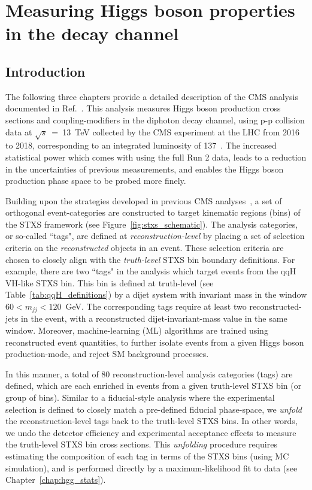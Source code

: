 \chapter{Measuring Higgs boson properties in the \Hgg decay channel}
\label{chap:hgg_overview}

\section{Introduction}\label{sec:hgg_introduction}
The following three chapters provide a detailed description of the CMS \Hgg analysis documented in Ref.~\cite{Sirunyan:2021ybb}. This analysis measures Higgs boson production cross sections and coupling-modifiers in the diphoton decay channel, using p-p collision data at $\sqrt{s}$~=~13~TeV collected by the CMS experiment at the LHC from 2016 to 2018, corresponding to an integrated luminosity of 137~\fbinv. The increased statistical power which comes with using the full Run 2 data, leads to a reduction in the uncertainties of previous \Hgg measurements, and enables the Higgs boson production phase space to be probed more finely.

Building upon the strategies developed in previous CMS \Hgg analyses~\cite{Sirunyan:2018ouh,CMS-PAS-HIG-18-029,Sirunyan:2020sum}, a set of orthogonal event-categories are constructed to target kinematic regions (bins) of the STXS framework (see Figure~\ref{fig:stxs_schematic}). The analysis categories, or so-called ``tags", are defined at \textit{reconstruction-level} by placing a set of selection criteria on the \textit{reconstructed} objects in an event. These selection criteria are chosen to closely align with the \textit{truth-level} STXS bin boundary definitions. For example, there are two ``tags" in the analysis which target events from the qqH VH-like STXS bin. This bin is defined at truth-level (see Table~\ref{tab:qqH_definitions}) by a dijet system with invariant mass in the window ${60<m_{jj}<120}$~GeV. The corresponding tags require at least two reconstructed-jets in the event, with a reconstructed dijet-invariant-mass value in the same window. Moreover, machine-learning (ML) algorithms are trained using reconstructed event quantities, to further isolate events from a given Higgs boson production-mode, and reject SM background processes.

In this manner, a total of 80 reconstruction-level analysis categories (tags) are defined, which are each enriched in events from a given truth-level STXS bin (or group of bins). Similar to a fiducial-style analysis where the experimental selection is defined to closely match a pre-defined fiducial phase-space, we \textit{unfold} the reconstruction-level tags back to the truth-level STXS bins. In other words, we undo the detector efficiency and experimental acceptance effects to measure the truth-level STXS bin cross sections. This \textit{unfolding} procedure requires estimating the composition of each tag in terms of the STXS bins (using MC simulation), and is performed directly by a maximum-likelihood fit to data (see Chapter~\ref{chap:hgg_stats}). 

